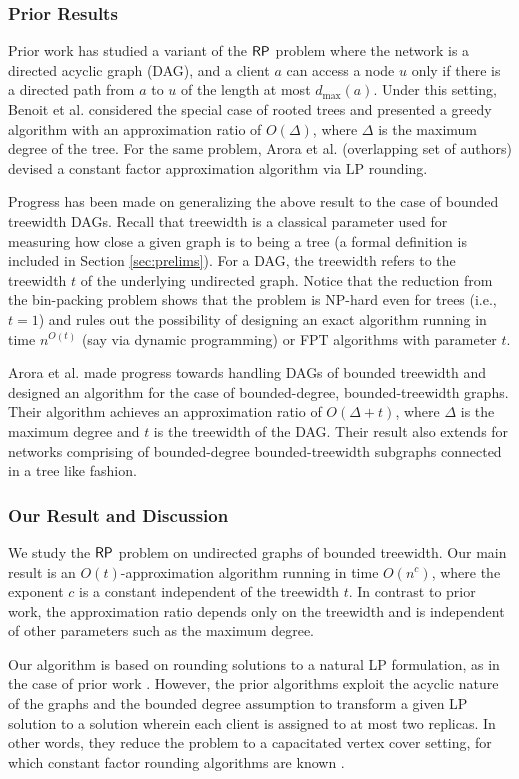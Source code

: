 \documentclass[11pt]{article}
\newcommand{\mypara}[1] {\subsubsection*{#1}}
\newcommand{\dmax} {d_{\max}}
\newcommand{\RP} {{\sf RP}}
\begin{document}
\mypara{Prior Results}
Prior work has studied a variant of the $\RP$ problem where the network is a directed acyclic graph (DAG),
and a client $a$ can access a node $u$ only if there is a directed path from $a$ to $u$ of the length at most $\dmax(a)$.
Under this setting, Benoit et al. \cite{benoit} considered the special case of rooted trees
and presented a greedy algorithm with an approximation ratio of $O(\Delta)$, where $\Delta$ is the maximum degree of the tree.
For the same problem, Arora et al. \cite{fst13} (overlapping set of authors) devised a constant factor approximation algorithm via LP rounding.

Progress has been made on generalizing the above result to the case of bounded treewidth DAGs.
Recall that treewidth \cite{tw4} is a classical parameter used for measuring how close a given graph is to being a tree
(a formal definition is included in Section \ref{sec:prelims}). 
For a DAG, the treewidth refers to the treewidth $t$ of the underlying undirected graph. 
Notice that the reduction from the bin-packing problem shows that the problem is NP-hard even for trees (i.e., $t=1$)
and rules out the possibility of designing an exact algorithm running in time $n^{O(t)}$ (say via dynamic programming)
or FPT algorithms with parameter $t$.

Arora et al. \cite{dag} made progress towards handling DAGs of bounded treewidth and designed an algorithm for the case of bounded-degree, bounded-treewidth graphs.
Their algorithm achieves an approximation ratio of $O(\Delta + t)$, where $\Delta$ is the maximum degree and $t$ is the treewidth of the DAG.
Their result also extends for networks comprising of bounded-degree bounded-treewidth subgraphs
connected in a tree like fashion. 

\mypara{Our Result and Discussion}
We study the $\RP$ problem on undirected graphs of bounded treewidth. 
Our main result is an $O(t)$-approximation algorithm running in time $O(n^c)$, where the exponent $c$ is a constant independent of the treewidth $t$.
In contrast to prior work, the approximation ratio depends only on the treewidth and is independent of other parameters such as the maximum degree.

Our algorithm is based on rounding solutions to a natural LP formulation, as in the case of prior work \cite{fst13,dag}.
However, the prior algorithms exploit the acyclic nature of the graphs 
and the bounded degree assumption to transform a given LP solution to a solution wherein each client is assigned to at most two replicas.
In other words, they reduce the problem to a capacitated vertex cover setting,
for which constant factor rounding algorithms are known \cite{Khuller-Saha}.
\end{document}
